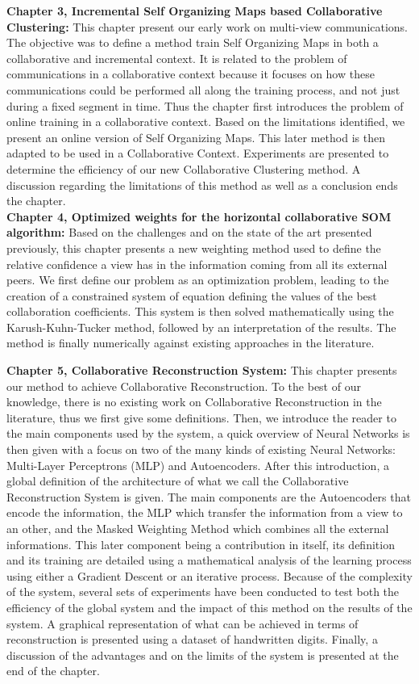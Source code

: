 \textbf{Chapter 3, Incremental Self Organizing Maps based Collaborative Clustering:} This chapter present our early work on multi-view communications. The objective was to define a method train Self Organizing Maps in both a collaborative and incremental context. It is related to the problem of communications in a collaborative context because it focuses on how these communications could be performed all along the training process, and not just during a fixed segment in time. Thus the chapter first introduces the problem of online training in a collaborative context. Based on the limitations identified, we present an online version of Self Organizing Maps. This later method is then adapted to be used in a Collaborative Context. Experiments are presented to determine the efficiency of our new Collaborative Clustering method. A discussion regarding the limitations of this method as well as a conclusion ends the chapter.\\

\textbf{Chapter 4, Optimized weights for the horizontal collaborative SOM algorithm:} Based on the challenges and on the state of the art presented previously, this chapter presents a new weighting method used to define the relative confidence a view has in the information coming from all its external peers. We first define our problem as an optimization problem, leading to the creation of a constrained system of equation defining the values of the best collaboration coefficients. This system is then solved mathematically using the Karush-Kuhn-Tucker method, followed by an interpretation of the results. The method is finally numerically against existing approaches in the literature.

\textbf{Chapter 5, Collaborative Reconstruction System:} This chapter presents our method to achieve Collaborative Reconstruction. To the best of our knowledge, there is no existing work on Collaborative Reconstruction in the literature, thus we first give some definitions. Then, we introduce the reader to the main components used by the system, a quick overview of Neural Networks is then given with a focus on two of the many kinds of existing Neural Networks: Multi-Layer Perceptrons (MLP) and Autoencoders. After this introduction, a global definition of the architecture of what we call the Collaborative Reconstruction System is given. The main components are the Autoencoders that encode the information, the MLP which transfer the information from a view to an other, and the Masked Weighting Method which combines all the external informations. This later component being a contribution in itself, its definition and its training are detailed using a mathematical analysis of the learning process using either a Gradient Descent or an iterative process. Because of the complexity of the system, several sets of experiments have been conducted to test both the efficiency of the global system and the impact of this method on the results of the system. A graphical representation of what can be achieved in terms of reconstruction is presented using a dataset of handwritten digits. Finally, a discussion of the advantages and on the limits of the system is presented at the end of the chapter.\\


